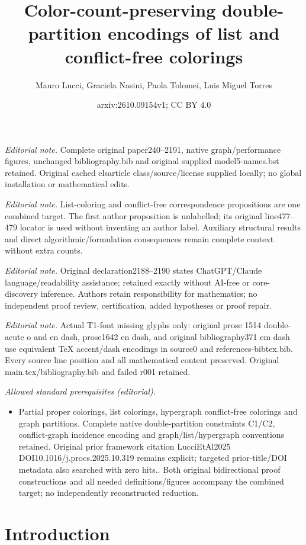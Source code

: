 \documentclass[preprint, 11pt, authoryear]{elsarticle}
\title{Color-count-preserving double-partition encodings of list and conflict-free colorings}
\author{Mauro Lucci, Graciela Nasini, Paola Tolomei, Luis Miguel Torres}
\date{arxiv:2610.09154v1; CC BY 4.0}
\begin{document}
\maketitle
\noindent\textit{Editorial note.} Complete original paper240--2191, native graph/performance figures, unchanged bibliography.bib and original supplied model5-names.bst retained. Original cached elsarticle class/source/license supplied locally; no global installation or mathematical edits.\par\medskip
\noindent\textit{Editorial note.} List-coloring and conflict-free correspondence propositions are one combined target. The first author proposition is unlabelled; its original line477--479 locator is used without inventing an author label. Auxiliary structural results and direct algorithmic/formulation consequences remain complete context without extra counts.\par\medskip
\noindent\textit{Editorial note.} Original declaration2188--2190 states ChatGPT/Claude language/readability assistance; retained exactly without AI-free or core-discovery inference. Authors retain responsibility for mathematics; no independent proof review, certification, added hypotheses or proof repair.\par\medskip
\noindent\textit{Editorial note.} Actual T1-font missing glyphs only: original prose 1514 double-acute o and en dash, prose1642 en dash, and original bibliography371 em dash use equivalent TeX accent/dash encodings in source0 and references-bibtex.bib. Every source line position and all mathematical content preserved. Original main.tex/bibliography.bib and failed r001 retained.\par\medskip
\noindent\textit{Allowed standard prerequisites (editorial).}\begin{itemize}
\item Partial proper colorings, list colorings, hypergraph conflict-free colorings and graph partitions. Complete native double-partition constraints C1/C2, conflict-graph incidence encoding and graph/list/hypergraph conventions retained. Original prior framework citation LucciEtAl2025 DOI10.1016/j.procs.2025.10.319 remains explicit; targeted prior-title/DOI metadata also searched with zero hits.. Both original bidirectional proof constructions and all needed definitions/figures accompany the combined target; no independently reconstructed reduction.
\end{itemize}\medskip
\section{Introduction}
\label{sec.introduction}
\end{document}
